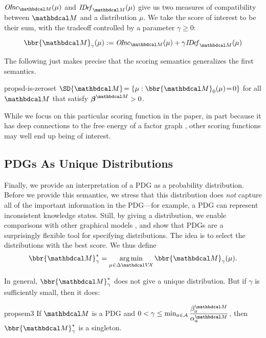 $\OInc_{\dg M}(\mu)$ and $\IDef_{\dg M}(\mu)$ give us two measures
of compatibility between ${\dg M}$ and a distribution $\mu$.
We take the score of interest to be their sum, with the tradeoff
controlled by a parameter $\gamma \ge 0$:

\begin{equation}
  	  \bbr{\dg M}_\gamma(\mu)
	 := \OInc_{\dg M}(\mu) + \gamma \IDef_{\dg M}(\mu)  \label{eqn:full-score}
\end{equation}

The following just makes precise that the scoring semantics generalizes the first semantics.

\begin{linked}{prop}{sd-is-zeroset}
	$\SD{\dg M} \!= \{ \mu : \bbr{\dg M}_0(\mu) \!=\! 0\}$ for 
	all $\dg M$
    that satisfy $\bbeta^{\dg M} > 0$. 
\end{linked}
          
While we focus on this particular scoring function in the paper, 
in part because
it has deep connections to the free energy of a factor graph \cite{KF09},
other scoring functions may well end up being of interest. 
        


\subsection{PDGs As Unique Distributions}\label{sec:uniq-dist-semantics}

Finally, we provide an interpretation of a PDG as a probability distribution.
Before we provide this semantics, we stress that this distribution does
\emph{not} capture all of the important information in the PDG---for example, a
PDG can represent inconsistent knowledge states.  Still, by giving a
distribution, we enable comparisons with other graphical models%
, and show that PDGs are
a surprisingly flexible tool for specifying distributions.  
The idea is to select the distributions with the best score. 
We thus define 
\begin{equation}
	\bbr{\dg M}_\gamma^* = \argmin_{\mu \in \Delta\V\!\X} \bbr{\dg M}_\gamma(\mu).
\end{equation}   

In general, $\bbr{\dg M}_\gamma^*$ does not give a unique distribution.  But if
$\gamma$ is sufficiently small, then it does:

\begin{linked}{prop}{sem3}
	If $\dg M$ is a PDG and $0 < \gamma \leq \min_{a \in \Ar} 
        {\displaystyle\frac {\beta_a^{\dg M}}{\alpha_a^{\dg M}} }$, then
	$\bbr{\dg M}_\gamma^*$ is a singleton. 
\end{linked}

